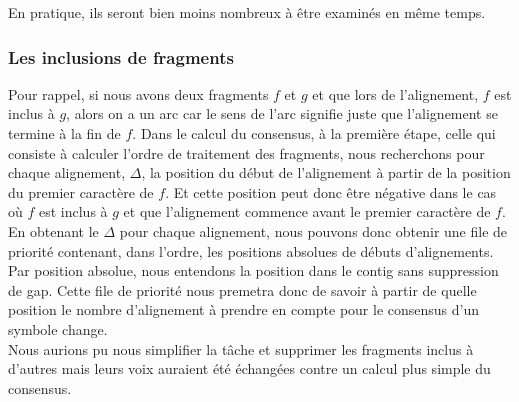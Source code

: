 En pratique, ils seront bien moins nombreux à être examinés en même temps.

\subsubsection*{Les inclusions de fragments}
Pour rappel, si nous avons deux fragments $f$ et $g$ et que lors de l'alignement, $f$ est inclus à $g$,
alors on a un arc  car le sens de l'arc signifie juste que l'alignement se termine à la fin de $f$.
Dans le calcul du consensus, à la première étape, celle qui consiste à calculer l'ordre de traitement des fragments,
nous recherchons pour chaque alignement, $\Delta$, la position du début de l'alignement à partir de la position du premier caractère de $f$.
Et cette position peut donc être négative dans le cas où $f$ est inclus à $g$ et que l'alignement commence avant le premier caractère de $f$.\\

En obtenant le $\Delta$ pour chaque alignement, nous pouvons donc obtenir une file de priorité contenant, dans l'ordre, les positions absolues de débuts d'alignements.
Par position absolue, nous entendons la position dans le contig sans suppression de gap.
Cette file de priorité nous premetra donc de savoir à partir de quelle position le nombre d'alignement à prendre en compte pour le consensus d'un symbole change.\\


Nous aurions pu nous simplifier la tâche et supprimer les fragments inclus à
d'autres mais leurs voix auraient été échangées contre un calcul plus simple
du consensus.
